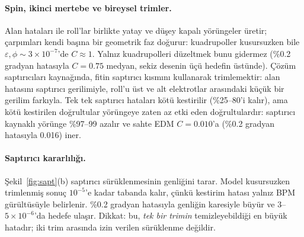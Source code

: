 \documentclass[12pt,a4paper]{extarticle}
\begin{document}
\paragraph{Spin, ikinci mertebe ve bireysel trimler.} Alan hataları ile roll'lar birlikte yatay ve düşey kapalı
yörüngeler üretir; çarpımları kendi başına bir geometrik faz doğurur: kuadrupoller kusursuzken bile
$\varepsilon,\phi\sim3\times10^{-7}$'de $C\approx1$. Yalnız kuadrupolleri düzeltmek bunu gidermez (\%0.2 gradyan
hatasıyla $C=0.75$ medyan, sekiz desenin üçü hedefin üstünde). Çözüm saptırıcıları kaynağında, fitin saptırıcı
kısmını kullanarak trimlemektir: alan hatasını saptırıcı gerilimiyle, roll'u üst ve alt elektrotlar arasındaki
küçük bir gerilim farkıyla. Tek tek saptırıcı hataları kötü kestirilir (\%25--80'i kalır), ama kötü kestirilen
doğrultular yörüngeye zaten az etki eden doğrultulardır: saptırıcı kaynaklı yörünge \%97--99 azalır ve sahte EDM
$C=0.010$'a (\%0.2 gradyan hatasıyla 0.016) iner.
\EslestirilmisParagraf

\paragraph{Saptırıcı kararlılığı.} Şekil~\ref{fig:sapt}(b) saptırıcı sürüklenmesinin genliğini tarar. Model
kusursuzken trimlenmiş sonuç $10^{-5}$'e kadar tabanda kalır, çünkü kestirim hatası yalnız BPM gürültüsüyle
belirlenir. \%0.2 gradyan hatasıyla genliğin karesiyle büyür ve $3$--$5\times10^{-6}$'da hedefe ulaşır. Dikkat:
bu, \emph{tek bir trimin} temizleyebildiği en büyük hatadır; iki trim arasında izin verilen sürüklenme değildir.
\end{document}
